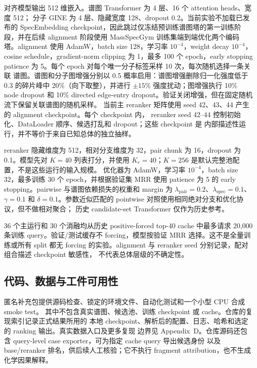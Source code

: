 \documentclass[UTF8,11pt]{ctexart}
\begin{document}
对齐模型输出 512 维嵌入。谱图 Transformer 为 4 层、16 个 attention heads、宽度 512；
分子 GINE 为 4 层、隐藏宽度 128、dropout 0.2。当前实验不加载已发布的 SpecEmbedding
checkpoint，因此跳过仅冻结预训练谱图塔的第一训练阶段，并在后续 alignment 阶段使用
MassSpecGym 训练集端到端优化两个编码塔。alignment 使用 AdamW，batch size 128，学习率
$10^{-4}$，weight
decay $10^{-4}$，cosine schedule，gradient-norm clipping 为 1，最多 100 个 epoch，early
stopping patience 为 5。每个 epoch 对每个唯一分子标签采样 10 次，每次随机选择一条关联
谱图。谱图和分子图增强分别以 0.5 概率启用：谱图增强删除归一化强度低于 0.3 的碎片峰中
20\%（向下取整），并进行 $\pm15\%$ 强度扰动；图增强执行 10\% node dropout 和 10\%
directed edge-entry dropout。验证关闭增强，但在固定随机流下保留关联谱图的随机采样。
当前主 reranker 矩阵使用 seed 42、43、44 产生的 alignment checkpoint。每个 checkpoint 内，
reranker seed 42--44 控制初始化、DataLoader 顺序、候选打乱和 dropout；这些 checkpoint 是
内部描述性运行，并不等价于来自已知总体的独立抽样。

reranker 隐藏维度为 512，相对分支维度为 32，pair chunk 为 16，dropout 为 0.1。模型先对
$K=40$ 列表打分，并使用 $K_r=40$；$K=256$ 是默认完整池配置，不是这些运行的输入规模。
优化器为 AdamW，学习率
$10^{-4}$，batch size 32，最多训练 30 个 epoch，并根据验证集 MRR 使用 patience 为 5 的
early stopping。pairwise 与谱图依赖损失的权重和 margin 为
$\lambda_{\mathrm{pair}}=0.2$、$\lambda_{\mathrm{spec}}=0.1$、$\gamma=0.1$ 和
$\delta=0.1$。参数近似匹配的 pointwise 对照使用相同绝对分支和优化协议，但不做相对聚合；
历史 candidate-set Transformer 仅作为历史参考。

36 个主运行和 30 个消融均从历史 positive-forced top-40 cache 中最多请求 20,000 条训练
query。验证/测试缓存不 forcing，模型按验证 MRR 选择。这不是全量训练或所有 split 都无
forcing 的实验。alignment 与 reranker seed 分别记录，配对组合描述 checkpoint 敏感性，
不代表总体层级的不确定性。

\subsection{代码、数据与工件可用性}

匿名补充包提供源码检查、锁定的环境文件、自动化测试和一个小型 CPU 合成 smoke test。
其中不包含真实谱图、候选池、训练 checkpoint 或 cache。仓库的复现索引记录正式结果所用的
本地 checkpoint、解析后的配置、日志、哈希和选定的 ranking 输出。真实数据入口及更多复现
边界见 Appendix~D。仓库源码还包含 query-level case exporter，可为指定 cache query 导出候选身份
以及 base/reranker 排名，供后续人工核验；它不执行 fragment attribution，也不生成化学因果解释。
\end{document}
